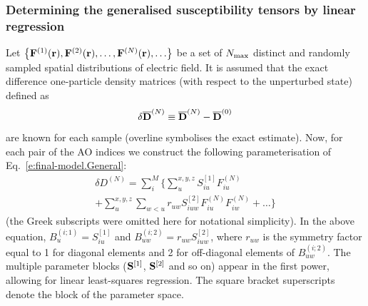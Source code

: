 \documentclass[aip,amsmath,amssymb,reprint,floatfix]{revtex4-1}
\begin{document}
\subsubsection{Determining the generalised susceptibility tensors by linear regression}

Let $\left\{ {\bf F}^{(1)}({\bf r}), {\bf F}^{(2)}({\bf r}), \ldots, {\bf F}^{(N)}({\bf r}), \ldots \right\}$ 
be a set of $N_{\rm max}$ distinct and randomly sampled 
spatial distributions of electric field. It is assumed that
the exact difference one\hyp{}particle density matrices (with respect to the unperturbed state)
defined as
%
\begin{equation}
 \delta \overline{\bf D}^{(N)} \equiv \overline{\bf D}^{(N)} - \overline{\bf D}^{(0)}
\end{equation}
%
are known for each sample (overline symbolises the exact estimate).
Now, for each pair of the AO indices we construct the following 
parameterisation of Eq.~\eqref{e:final-model.General}:
%
\begin{multline}\label{e:final-model.General.Parameters}
 \delta D^{(N)} = \sum_{i }^M \Big\{ 
                              \sum_u^{x,y,z} S^{[1]}_{iu} F_{iu}^{(N)} \\
                +             \sum_{u}^{x,y,z} \sum_{w<u} r_{uw} S^{[2]}_{iuw} F_{iu}^{(N)} F_{iw}^{(N)} 
                        + \ldots \Big\}
\end{multline}
%
(the Greek subscripts were omitted here for notational simplicity).
In the above equation, $B_u^{(i;1)} = S^{[1]}_{iu}$ and $B_{uw}^{(i;2)} = r_{uw} S^{[2]}_{iuw}$,
where $r_{uw}$ is the symmetry factor equal to 1 for diagonal elements and 2 for off\hyp{}diagonal
elements of $B_{uw}^{(i;2)}$.
The multiple parameter blocks
(${\bf S}^{[1]}$, ${\bf S}^{[2]}$ and so on)
appear in the first power, allowing for linear least\hyp{}squares regression.
The square bracket superscripts denote the block of the parameter space. 
\end{document}
